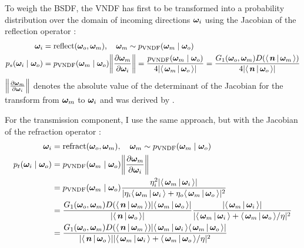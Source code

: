 To weigh the BSDF, the VNDF has first to be transformed into a probability distribution over the domain of incoming directions $\bm{\omega}_i$ using the Jacobian of the reflection operator :
\begin{equation}
    \begin{aligned}
        \wi &= \reflect(\wo, \wm), \quad \wm \sim p_\mathrm{VNDF}(\wm \mid \wo)\\
        p_s(\wi \mid \wo)
        &= p_\mathrm{VNDF}(\wm \mid \wo) \left\|\frac{\partial \wm}{\partial \wi}\right\|
        = \frac{p_\mathrm{VNDF}(\wm \mid \wo)}{4|\VdotH|}
        = \frac{G_1(\wo, \wm) D(\NdotH)}{4|\NdotV|}
    \end{aligned}
\end{equation}
$\left\|\frac{\partial \wm}{\partial \wi}\right\|$ denotes the absolute value of the determinant of the Jacobian for the transform from $\bm{\omega}_m$ to $\bm{\omega}_i$ and was derived by \textcite{walter2007}.

For the transmission component, I use the same approach, but with the Jacobian of the refraction operator :
\begin{equation}
    \begin{aligned}
        \wi &= \refract(\wo, \wm), \quad \wm \sim p_\mathrm{VNDF}(\wm \mid \wo)\\
        p_t(\wi \mid \wo)
        &= p_\mathrm{VNDF}(\wm \mid \wo) \left\|\frac{\partial \wm}{\partial \wi}\right\| \\
        &= p_\mathrm{VNDF}(\wm \mid \wo) \frac{\eta_i^2 |\LdotH|}{|\eta_i \LdotH + \eta_o \VdotH|^2} \\
        &= \frac{G_1(\wo, \wm) D(\NdotH) |\VdotH|}{|\NdotV|} \frac{|\LdotH|}{|\LdotH + \VdotH / \eta|^2} \\
        &= \frac{G_1(\wo, \wm) D(\NdotH) |\LdotH \VdotH|}{|\NdotV| |\LdotH + \VdotH / \eta|^2}
    \end{aligned}
\end{equation}

